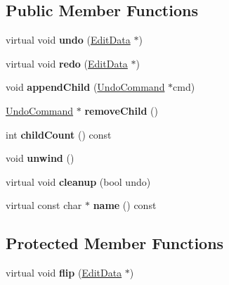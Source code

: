\subsection*{Public Member Functions}
\begin{DoxyCompactItemize}
\item 
\mbox{\label{class_ms_1_1_undo_command_a42a2038f903e77e6bb5881209b764186}} 
virtual void {\bfseries undo} (\hyperlink{class_ms_1_1_edit_data}{Edit\+Data} $\ast$)
\item 
\mbox{\label{class_ms_1_1_undo_command_a7fccbb0cf027a5e3b43176a5e0213f75}} 
virtual void {\bfseries redo} (\hyperlink{class_ms_1_1_edit_data}{Edit\+Data} $\ast$)
\item 
\mbox{\label{class_ms_1_1_undo_command_a0f5b568325d235501e5cc197b7a4d4c8}} 
void {\bfseries append\+Child} (\hyperlink{class_ms_1_1_undo_command}{Undo\+Command} $\ast$cmd)
\item 
\mbox{\label{class_ms_1_1_undo_command_ad645cbed278b04cea2164006b52c4d8f}} 
\hyperlink{class_ms_1_1_undo_command}{Undo\+Command} $\ast$ {\bfseries remove\+Child} ()
\item 
\mbox{\label{class_ms_1_1_undo_command_a701d710e19f4d356f2b12d093729d295}} 
int {\bfseries child\+Count} () const
\item 
\mbox{\label{class_ms_1_1_undo_command_abc893037b5a33408c25552b8579debe4}} 
void {\bfseries unwind} ()
\item 
\mbox{\label{class_ms_1_1_undo_command_a0bbdf4bc79885d76228b155599fb46ce}} 
virtual void {\bfseries cleanup} (bool undo)
\item 
\mbox{\label{class_ms_1_1_undo_command_acdd15da86ef5878bc98ef2be084cc4be}} 
virtual const char $\ast$ {\bfseries name} () const
\end{DoxyCompactItemize}
\subsection*{Protected Member Functions}
\begin{DoxyCompactItemize}
\item 
\mbox{\label{class_ms_1_1_undo_command_a861162fe6c105a00dfec5a5b70a690a5}} 
virtual void {\bfseries flip} (\hyperlink{class_ms_1_1_edit_data}{Edit\+Data} $\ast$)
\end{DoxyCompactItemize}


